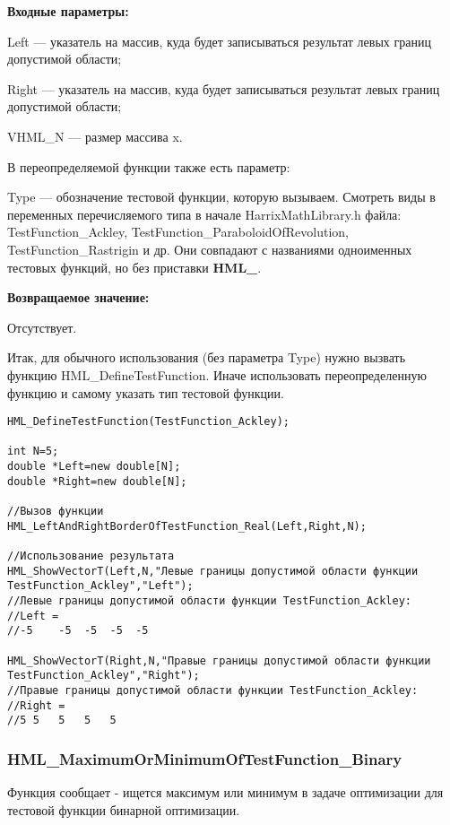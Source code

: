 \documentclass[a4paper,12pt]{article}
\begin{document}
\textbf{Входные параметры:}

Left --- указатель на массив, куда будет записываться результат левых границ допустимой области;

Right --- указатель на массив, куда будет записываться результат левых границ допустимой области;
	 
VHML\_N --- размер массива x.

В переопределяемой функции также есть параметр:
  
Type --- обозначение тестовой функции, которую вызываем.
Смотреть виды в переменных перечисляемого типа в начале HarrixMathLibrary.h файла: TestFunction\_Ackley, TestFunction\_ParaboloidOfRevolution, TestFunction\_Rastrigin и др. Они совпадают с названиями одноименных тестовых функций, но без приставки \textbf{HML\_}.

\textbf{Возвращаемое значение:}
 
Отсутствует.

Итак, для обычного использования (без параметра Type) нужно вызвать функцию HML\_DefineTestFunction. Иначе использовать переопределенную функцию и самому указать тип тестовой функции.


\begin{lstlisting}[label=code_use_HML_LeftBorderOfTestFunction_Real,caption=Пример использования]
HML_DefineTestFunction(TestFunction_Ackley);

int N=5;
double *Left=new double[N];
double *Right=new double[N];

//Вызов функции
HML_LeftAndRightBorderOfTestFunction_Real(Left,Right,N);

//Использование результата
HML_ShowVectorT(Left,N,"Левые границы допустимой области функции TestFunction_Ackley","Left");
//Левые границы допустимой области функции TestFunction_Ackley:
//Left =	
//-5	-5	-5	-5	-5

HML_ShowVectorT(Right,N,"Правые границы допустимой области функции TestFunction_Ackley","Right");
//Правые границы допустимой области функции TestFunction_Ackley:
//Right =	
//5	5	5	5	5
\end{lstlisting}

\subsubsection{HML\_MaximumOrMinimumOfTestFunction\_Binary}\label{HML_MaximumOrMinimumOfTestFunction_Binary}

	Функция сообщает - ищется максимум или минимум в задаче оптимизации для тестовой функции бинарной оптимизации.
\end{document}

